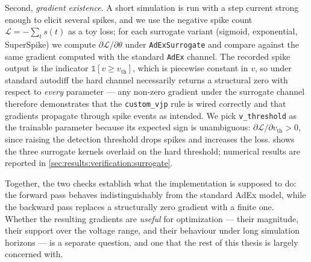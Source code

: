 Second, \emph{gradient existence}.
A short simulation is run with a step current strong enough to elicit several spikes, and we use the negative spike count $\mathcal{L} = -\sum_t s(t)$ as a toy loss; for each surrogate variant (sigmoid, exponential, SuperSpike) we compute $\partial \mathcal{L} / \partial \theta$ under \texttt{AdExSurrogate} and compare against the same gradient computed with the standard \texttt{AdEx} channel.
The recorded spike output is the indicator $\mathds{1}[v \geq v_{\text{th}}]$, which is piecewise constant in $v$, so under standard autodiff the hard channel necessarily returns a structural zero with respect to \emph{every} parameter --- any non-zero gradient under the surrogate channel therefore demonstrates that the \texttt{custom\_vjp} rule is wired correctly and that gradients propagate through spike events as intended.
We pick \texttt{v\_threshold} as the trainable parameter because its expected sign is unambiguous: $\partial \mathcal{L} / \partial v_{\text{th}} > 0$, since raising the detection threshold drops spikes and increases the loss.
 shows the three surrogate kernels overlaid on the hard threshold; numerical results are reported in \cref{sec:results:verification:surrogate}.

Together, the two checks establish what the implementation is supposed to do:
the forward pass behaves indistinguishably from the standard \gls{AdEx} model, while the backward pass replaces a structurally zero gradient with a finite one.
Whether the resulting gradients are \emph{useful} for optimization --- their magnitude, their support over the voltage range, and their behaviour under long simulation horizons --- is a separate question, and one that the rest of this thesis is largely concerned with.

